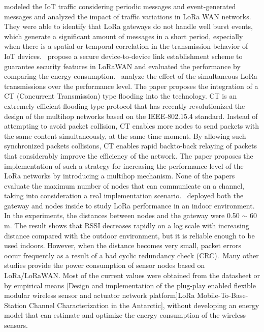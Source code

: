  \cite{gupta_modelling_2017}   \citet{gupta_modelling_2017} modeled the IoT traffic considering periodic messages and event-generated messages and analyzed the impact of traffic variations in LoRa WAN networks. They were able to identify that LoRa gateways do not handle well burst events, which generate a significant amount of messages in a short period, especially when there is a spatial or temporal correlation in the transmission behavior of IoT devices.~   \newline 
 \cite{kim_secure_2018}   \citet{kim_secure_2018} propose a secure device-to-device link establishment scheme to guarantee security features in LoRaWAN and evaluated the performance by comparing the energy consumption.~   \newline 
 \cite{liao_multi-hop_2017}   \citet{liao_multi-hop_2017} analyze the effect of the simultaneous LoRa transmissions over the performance level. The paper proposes the integration of a CT (Concurrent Transmission) type flooding into the technology. CT is an extremely efficient flooding type protocol that has recently revolutionized the design of the multihop networks based on the IEEE-802.15.4 standard. Instead of attempting to avoid packet collision, CT enables more nodes to send packets with the same content simultaneously, at the same time moment. By allowing such synchronized packets collisions, CT enables rapid backto-back relaying of packets that considerably improve the efficiency of the network. The paper proposes the implementation of such a strategy for increasing the performance level of the LoRa networks by introducing a multihop mechanism. None of the papers evaluate the maximum number of nodes that can communicate on a channel, taking into consideration a real implementation scenario.~   \newline 
 \cite{neumann_indoor_2016}   \citet{neumann_indoor_2016} deployed both the gateway and nodes inside to study LoRa performance in an indoor environment. In the experiments, the distances between nodes and the gateway were 0.50 {$\sim$} 60 m. The result shows that RSSI decreases rapidly on a log scale with increasing distance compared with the outdoor environment, but it is reliable enough to be used indoors. However, when the distance becomes very small, packet errors occur frequently as a result of a bad cyclic redundancy check (CRC).~Many other studies provide the power consumption of sensor nodes based on LoRa/LoRaWAN. Most of the current values were obtained from the datasheet or by empirical means \cite{neumann_indoor_2016}[Design and implementation of the plug-play enabled flexible modular wireless sensor and actuator network platform]LoRa Mobile-To-Base-Station Channel Characterization in the Antarctic], without developing an energy model that can estimate and optimize the energy consumption of the wireless sensors.~   \newline 

